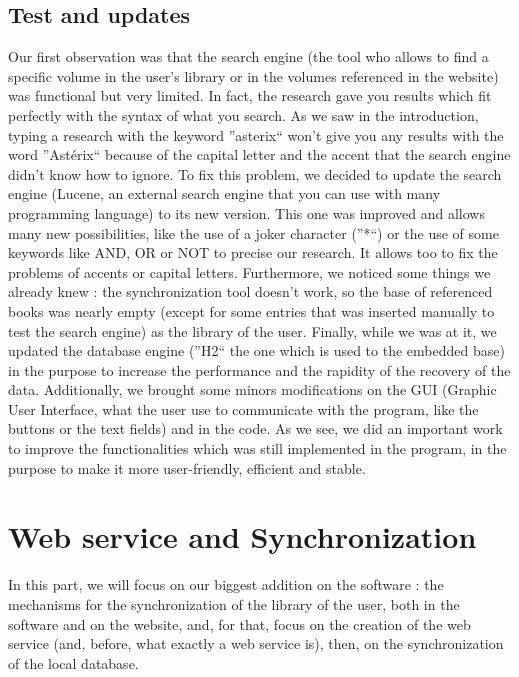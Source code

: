 \documentclass[11pt]{report} %
\begin{document}
\section{Test and updates}
Our first observation was that the search engine (the tool who allows to find a specific volume in the user's library or in the volumes referenced in the website) was functional but very limited. In fact, the research gave you results which fit perfectly with the syntax of what you search. As we saw in the introduction, typing a research with the keyword ''asterix`` won't give you any results with the word ''Astérix`` because of the capital letter and the accent that the search engine didn't know how to ignore. 
\newline\newline To fix this problem, we decided to update the search engine (Lucene, an external search engine that you can use with many programming language) to its new version. This one was improved and allows many new possibilities, like the use of a joker character (''*``) or the use of some keywords like AND, OR or NOT to precise our research. It allows too to fix the problems of accents or capital letters.
\newline\newline Furthermore, we noticed some things we already knew : the synchronization tool doesn't work, so the base of referenced books was nearly empty (except for some entries that was inserted manually to test the search engine) as the library of the user.
\newline\newline Finally, while we was at it, we updated the database engine (''H2`` the one which is used to the embedded base) in the purpose to increase the performance and the rapidity of the recovery of the data. Additionally, we brought some minors modifications on the GUI (Graphic User Interface, what the user use to communicate with the program, like the buttons or the text fields) and in the code.
\newline As we see, we did an important work to improve the functionalities which was still implemented in the program, in the purpose to make it more user-friendly, efficient and stable.

%
% 

\chapter{Web service and Synchronization}
In this part, we will focus on our biggest addition on the software : the mechanisms for the synchronization of the library of the user, both in the software and on the website, and, for that, focus on the creation of the web service (and, before, what exactly a web service is), then, on the synchronization of the local database.
\end{document}
